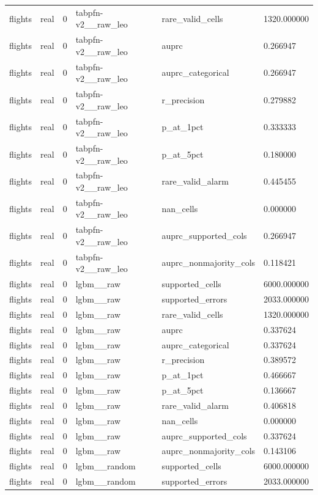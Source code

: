 \begin{tabular}{llllll}
flights & real & 0 & tabpfn-v2\_\_raw\_leo & rare\_valid\_cells & 1320.000000 \\
flights & real & 0 & tabpfn-v2\_\_raw\_leo & auprc & 0.266947 \\
flights & real & 0 & tabpfn-v2\_\_raw\_leo & auprc\_categorical & 0.266947 \\
flights & real & 0 & tabpfn-v2\_\_raw\_leo & r\_precision & 0.279882 \\
flights & real & 0 & tabpfn-v2\_\_raw\_leo & p\_at\_1pct & 0.333333 \\
flights & real & 0 & tabpfn-v2\_\_raw\_leo & p\_at\_5pct & 0.180000 \\
flights & real & 0 & tabpfn-v2\_\_raw\_leo & rare\_valid\_alarm & 0.445455 \\
flights & real & 0 & tabpfn-v2\_\_raw\_leo & nan\_cells & 0.000000 \\
flights & real & 0 & tabpfn-v2\_\_raw\_leo & auprc\_supported\_cols & 0.266947 \\
flights & real & 0 & tabpfn-v2\_\_raw\_leo & auprc\_nonmajority\_cols & 0.118421 \\
flights & real & 0 & lgbm\_\_raw & supported\_cells & 6000.000000 \\
flights & real & 0 & lgbm\_\_raw & supported\_errors & 2033.000000 \\
flights & real & 0 & lgbm\_\_raw & rare\_valid\_cells & 1320.000000 \\
flights & real & 0 & lgbm\_\_raw & auprc & 0.337624 \\
flights & real & 0 & lgbm\_\_raw & auprc\_categorical & 0.337624 \\
flights & real & 0 & lgbm\_\_raw & r\_precision & 0.389572 \\
flights & real & 0 & lgbm\_\_raw & p\_at\_1pct & 0.466667 \\
flights & real & 0 & lgbm\_\_raw & p\_at\_5pct & 0.136667 \\
flights & real & 0 & lgbm\_\_raw & rare\_valid\_alarm & 0.406818 \\
flights & real & 0 & lgbm\_\_raw & nan\_cells & 0.000000 \\
flights & real & 0 & lgbm\_\_raw & auprc\_supported\_cols & 0.337624 \\
flights & real & 0 & lgbm\_\_raw & auprc\_nonmajority\_cols & 0.143106 \\
flights & real & 0 & lgbm\_\_random & supported\_cells & 6000.000000 \\
flights & real & 0 & lgbm\_\_random & supported\_errors & 2033.000000 \\

\end{tabular}
